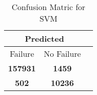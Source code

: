 \begin{table}[] 
\caption{Confusion Matric for SVM} 
\label{Table: Prediction Accuracy-NoneSVM95.0EKF-ignoreReflection-Reflection} 
\centering 
\begin{tabular} 
 {@{}ccc@{}} 
\toprule 
\multicolumn{2}{c}{\textbf{Predicted}}
 \\ \midrule 
\multicolumn{1}{|c|}{Failure} & 
\multicolumn{1}{c|}{No Failure}
 \\ \midrule 
\multicolumn{1}{|c|}{\color{green}\textbf{157931}} & 
\multicolumn{1}{c|}{\color{red}\textbf{1459}}
 \\ \midrule 
\multicolumn{1}{|c|}{\color{red}\textbf{502}} & 
\multicolumn{1}{c|}{\color{green}\textbf{10236}}
 \\ \bottomrule 
\end{tabular} 
\end{table} 
